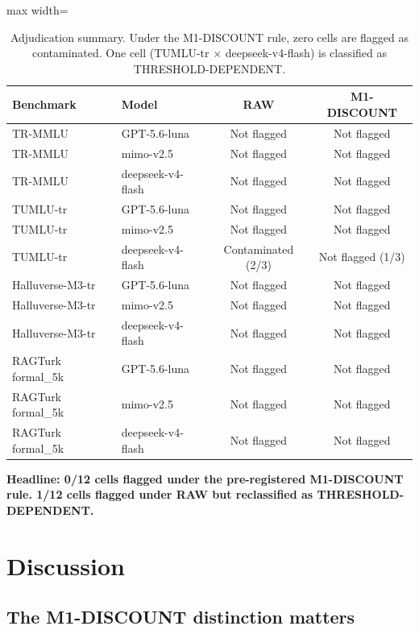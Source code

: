 \documentclass[11pt]{article}
\begin{document}
\begin{table}[t]
\centering
\begin{adjustbox}{max width=\textwidth}
\begin{tabular}{llcc}
\toprule
\textbf{Benchmark} & \textbf{Model} & \textbf{RAW} & \textbf{M1-DISCOUNT} \\
\midrule
TR-MMLU & GPT-5.6-luna & Not flagged & Not flagged \\
TR-MMLU & mimo-v2.5 & Not flagged & Not flagged \\
TR-MMLU & deepseek-v4-flash & Not flagged & Not flagged \\
TUMLU-tr & GPT-5.6-luna & Not flagged & Not flagged \\
TUMLU-tr & mimo-v2.5 & Not flagged & Not flagged \\
TUMLU-tr & deepseek-v4-flash & Contaminated (2/3) & Not flagged (1/3) \\
Halluverse-M3-tr & GPT-5.6-luna & Not flagged & Not flagged \\
Halluverse-M3-tr & mimo-v2.5 & Not flagged & Not flagged \\
Halluverse-M3-tr & deepseek-v4-flash & Not flagged & Not flagged \\
RAGTurk formal\_5k & GPT-5.6-luna & Not flagged & Not flagged \\
RAGTurk formal\_5k & mimo-v2.5 & Not flagged & Not flagged \\
RAGTurk formal\_5k & deepseek-v4-flash & Not flagged & Not flagged \\
\bottomrule
\end{tabular}%
\end{adjustbox}
\caption{Adjudication summary. Under the M1-DISCOUNT rule, zero cells are flagged as contaminated. One cell (TUMLU-tr $\times$ deepseek-v4-flash) is classified as THRESHOLD-DEPENDENT.}
\label{tab:adjudication}
\end{table}

\textbf{Headline: 0/12 cells flagged under the pre-registered M1-DISCOUNT rule. 1/12 cells flagged under RAW but reclassified as THRESHOLD-DEPENDENT.}

\section{Discussion}

\subsection{The M1-DISCOUNT distinction matters}
\end{document}

